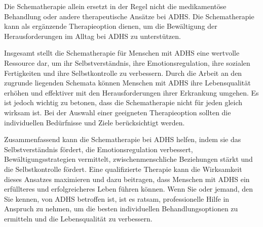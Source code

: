 Die Schematherapie allein ersetzt in der Regel nicht die medikamentöse Behandlung oder andere therapeutische Ansätze bei ADHS. Die Schematherapie kann als ergänzende Therapieoption dienen, um die Bewältigung der Herausforderungen im Alltag bei ADHS zu unterstützen.

Insgesamt stellt die Schematherapie für Menschen mit ADHS eine wertvolle Ressource dar, um ihr Selbstverständnis, ihre Emotionsregulation, ihre sozialen Fertigkeiten und ihre Selbstkontrolle zu verbessern. Durch die Arbeit an den zugrunde liegenden Schemata können Menschen mit ADHS ihre
Lebensqualität erhöhen und effektiver mit den Herausforderungen ihrer Erkrankung umgehen. Es ist jedoch wichtig zu betonen, dass die Schematherapie nicht für jeden gleich wirksam ist. Bei der Auswahl einer geeigneten Therapieoption sollten die individuellen Bedürfnisse und Ziele berücksichtigt werden.

Zusammenfassend kann die Schematherapie bei ADHS helfen, indem sie das Selbstverständnis fördert, die Emotionsregulation verbessert, Bewältigungsstrategien vermittelt, zwischenmenschliche Beziehungen stärkt und die Selbstkontrolle fördert. Eine qualifizierte Therapie kann die Wirksamkeit dieses Ansatzes maximieren und dazu beitragen, dass Menschen mit ADHS ein erfüllteres und erfolgreicheres Leben führen können. Wenn Sie oder jemand, den Sie kennen, von ADHS betroffen ist, ist es ratsam, professionelle Hilfe in Anspruch zu nehmen, um die besten individuellen Behandlungsoptionen zu ermitteln und die Lebensqualität zu verbessern.

